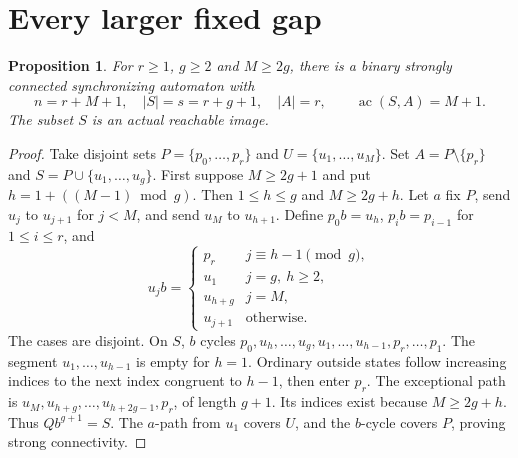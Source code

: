 \documentclass[10pt]{article}
\newtheorem{proposition}[theorem]{Proposition}
\newcommand{\ac}{\operatorname{ac}}
\begin{document}
\section{Every larger fixed gap}
\begin{proposition}\label{prop:gaps}
For $r\ge1$, $g\ge2$ and $M\ge2g$, there is a binary strongly connected synchronizing automaton with
\[
 n=r+M+1,\quad |S|=s=r+g+1,\quad |A|=r,
 \qquad \ac(S,A)=M+1.
\]
The subset $S$ is an actual reachable image.
\end{proposition}
\begin{proof}
Take disjoint sets $P=\{p_0,\ldots,p_r\}$ and $U=\{u_1,\ldots,u_M\}$.
Set $A=P\setminus\{p_r\}$ and $S=P\cup\{u_1,\ldots,u_g\}$.
First suppose $M\ge2g+1$ and put $h=1+((M-1)\bmod g)$.
Then $1\le h\le g$ and $M\ge2g+h$.
Let $a$ fix $P$, send $u_j$ to $u_{j+1}$ for $j<M$, and send $u_M$ to $u_{h+1}$.
Define $p_0b=u_h$, $p_ib=p_{i-1}$ for $1\le i\le r$, and
\[
 u_jb=\begin{cases}
 p_r&j\equiv h-1\pmod g,\\
 u_1&j=g,\ h\ge2,\\
 u_{h+g}&j=M,\\
 u_{j+1}&\text{otherwise}.
 \end{cases}
\]
The cases are disjoint. On $S$, $b$ cycles
$p_0,u_h,\ldots,u_g,u_1,\ldots,u_{h-1},p_r,\ldots,p_1$.
The segment $u_1,\ldots,u_{h-1}$ is empty for $h=1$.
Ordinary outside states follow increasing indices to the next index
congruent to $h-1$, then enter $p_r$.
The exceptional path is $u_M,u_{h+g},\ldots,u_{h+2g-1},p_r$, of length $g+1$.
Its indices exist because $M\ge2g+h$.
Thus $Qb^{g+1}=S$. The $a$-path from $u_1$ covers $U$, and the $b$-cycle covers $P$,
proving strong connectivity.


\end{proof}
\end{document}
